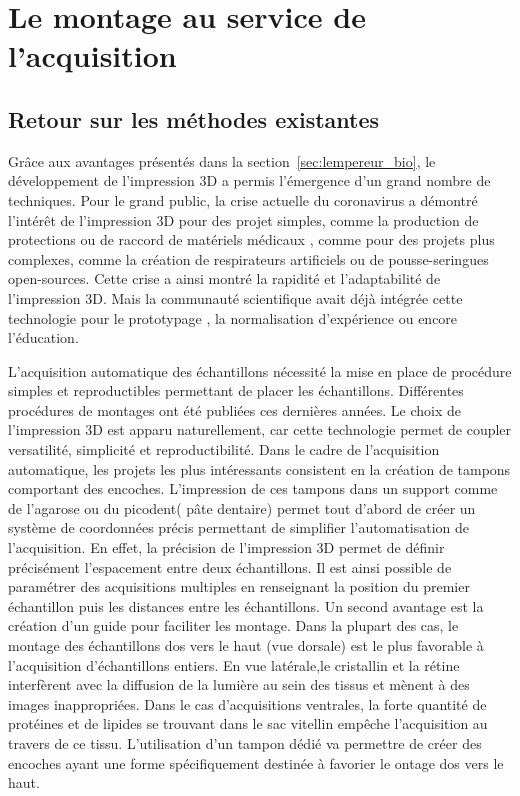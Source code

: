 \documentclass[\main/main.tex]{subfiles}
\begin{document}
\section{
    \label{sec:montage}
    Le montage au service de l'acquisition
    }

    \subsection{Retour sur les méthodes existantes}
    
%
Grâce aux avantages présentés dans la section~\ref{sec:lempereur_bio}, le développement de l'impression 3D a permis l'émergence d'un grand nombre de techniques.
%
Pour le grand public, la crise actuelle du coronavirus a démontré l'intérêt de l'impression 3D
pour des projet simples, comme la production de protections ou de raccord de matériels médicaux \cite{callahan_2020,ishack_2020,wesemann_2020}, comme pour des projets plus complexes, comme la création de respirateurs artificiels ou de pousse-seringues open-sources\cite{na_website_nda}.
%
Cette crise a ainsi montré la rapidité et l'adaptabilité de l'impression 3D.
%
Mais la communauté scientifique avait déjà intégrée cette technologie pour le prototypage \cite{he_2016}, la normalisation d'expérience \cite{pinskiy_2013} ou encore l'éducation\cite{maiachagas_2017}.
    
%
L'acquisition automatique des échantillons nécessité la mise en place de procédure simples
et reproductibles permettant de placer les échantillons.
%
Différentes procédures de montages ont été publiées ces dernières années.
%
Le choix de l'impression 3D est apparu naturellement, car cette technologie permet de coupler versatilité, simplicité et reproductibilité.
%
Dans le cadre de l'acquisition automatique, les projets les plus intéressants consistent en la création de tampons comportant des encoches.
%
L'impression de ces tampons dans un support comme de l'agarose ou du picodent( pâte dentaire) permet tout d'abord de créer un système de coordonnées précis
permettant de simplifier l'automatisation de l'acquisition. En effet, la précision de l'impression 3D permet de définir précisément l'espacement entre deux échantillons.
Il est ainsi possible de paramétrer des acquisitions multiples en renseignant la position du premier échantillon puis les distances entre les échantillons.
%
Un second avantage est la création d'un guide pour faciliter les montage. Dans la plupart des cas, le montage des échantillons dos vers le haut (vue dorsale)
est le plus favorable à l'acquisition d'échantillons entiers. En vue latérale,le cristallin et la rétine interfèrent avec la diffusion de la lumière au sein des tissus et mènent à des images inappropriées.
Dans le cas d'acquisitions ventrales, la forte quantité de protéines et de lipides se trouvant dans le sac vitellin empêche l'acquisition au travers de ce tissu.
%
L'utilisation d'un tampon dédié va permettre de créer des encoches ayant une forme spécifiquement destinée à favorier le ontage dos vers le haut.
\end{document}
